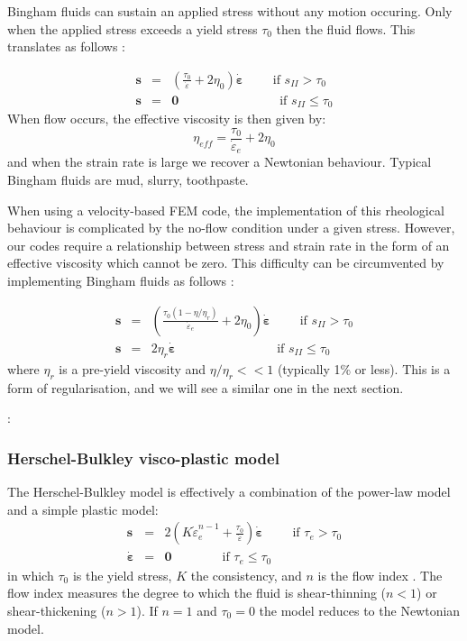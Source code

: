 Bingham fluids can sustain an applied stress without any motion occuring. Only when the applied stress exceeds
a yield stress $\tau_0$ then the fluid flows. This translates as follows \cite{reddybook2}:

\begin{eqnarray}
{\bm s} &=& \left(  \frac{\tau_0}{\dot{\varepsilon}} + 2 \eta_0  \right)\dot{\bm \varepsilon} \qquad \text{ if } {s}_{II}>\tau_0 \\
{\bm s} &=& {\bm 0} \qquad\qquad\qquad\qquad  \text{if } {s}_{II} \leq \tau_0 
\end{eqnarray}
When flow occurs, the effective viscosity is then given by:
\[
\eta_{eff} =  \frac{\tau_0}{\dot{\varepsilon}_e} + 2 \eta_0 
\]
and when the strain rate is large we recover a Newtonian behaviour.
Typical Bingham fluids are mud, slurry, toothpaste.  

When using a velocity-based FEM code, the implementation of this rheological behaviour 
is complicated by the no-flow condition under a given stress. However, our codes
require a relationship between stress and strain rate in the form of an effective viscosity
which cannot be zero. 
This difficulty can be circumvented by implementing Bingham fluids as follows \cite{reddybook2}:

\begin{eqnarray}
{\bm s} &=& \left(  \frac{\tau_0(1-\eta/\eta_r)}{\dot{\varepsilon}_e} + 2 \eta_0  \right)\dot{\bm \varepsilon} \qquad \text{ if } {s}_{II}>\tau_0 \\
{\bm s} &=& 2 \eta_r \dot{\bm \varepsilon}  \qquad\qquad\qquad\qquad  \text{if } {s}_{II} \leq \tau_0 
\end{eqnarray}
where $\eta_r$ is a pre-yield viscosity and $\eta/\eta_r<<1$ (typically 1\% or less). This is a form of 
regularisation, and we will see a similar one in the next section.

\Literature: \cite{blmi97,mizi01,maky17,syga14,bingham,baru09}

\subsubsection{Herschel-Bulkley visco-plastic model}

The Herschel-Bulkley model is effectively a combination of the power-law model and 
a simple plastic model:
\begin{eqnarray}
{\bm s} &=& 2 \left(  K \dot{\varepsilon}_e^{n-1} + \frac{\tau_0}{\dot{\varepsilon}}\right)\dot{\bm \varepsilon} \qquad \text{ if } {\tau}_{e}>\tau_0 \\
\dot{\bm \varepsilon} &=& {\bm 0} \qquad\qquad \text{if }{\tau}_{e} \leq \tau_0 
\end{eqnarray}
in which $\tau_0$ is the yield stress, $K$ the consistency, and $n$ is the flow index \cite{bemj04}.
The flow index measures the degree to which the fluid is shear-thinning ($n<1$) or shear-thickening ($n>1$).
If $n=1$ and $\tau_0=0$ the model reduces to the Newtonian model. 

